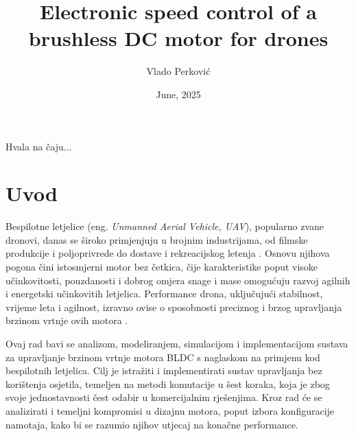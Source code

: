 \documentclass[diplomskirad]{fer}
\title{Electronic speed control of a brushless DC motor for drones}
\author{Vlado Perković}
\date{June, 2025}
\begin{document}
\maketitle




\begin{zahvale}
	Hvala na čaju...
\end{zahvale}

\mainmatter

\tableofcontents
\listoftodos{}
\newpage

\chapter{Uvod}
\label{pog:uvod}

Bespilotne letjelice (eng. \textit{Unmanned Aerial Vehicle, UAV}), popularno
zvane dronovi, danas se široko primjenjuju u brojnim industrijama, od filmske
produkcije i poljoprivrede do dostave i rekreacijskog letenja
\cite{cite:primjena}. Osnovu njihova pogona čini istosmjerni motor bez četkica,
čije karakteristike poput visoke učinkovitosti, pouzdanosti i dobrog omjera
snage i mase omogućuju razvoj agilnih i energetski učinkovitih letjelica.
Performance drona, uključujući stabilnost, vrijeme leta i agilnost, izravno
ovise o sposobnosti preciznog i brzog upravljanja brzinom vrtnje ovih motora
\cite{cite:karakteristike_motora}.

Ovaj rad bavi se analizom, modeliranjem, simulacijom i implementacijom sustava
za upravljanje brzinom vrtnje motora BLDC s naglaskom na primjenu kod
bespilotnih letjelica. Cilj je istražiti i implementirati sustav upravljanja
bez korištenja osjetila, temeljen na metodi komutacije u šest koraka, koja je
zbog svoje jednostavnosti čest odabir u komercijalnim rješenjima. Kroz rad će
se analizirati i temeljni kompromisi u dizajnu motora, poput izbora
konfiguracije namotaja, kako bi se razumio njihov utjecaj na konačne
performance.
\end{document}
